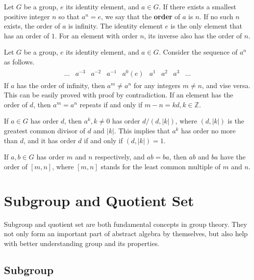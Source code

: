 Let $G$ be a group, $e$ its identity element, and $a\in G$. If there exists a smallest positive integer $n$ so that $a^n = e$, we say that the \textbf{order} of $a$ is $n$. If no such $n$ exists, the order of $a$ is infinity. The identity element $e$ is the only element that has an order of $1$. For an element with order $n$, its inverse also has the order of $n$.

Let $G$ be a group, $e$ its identity element, and $a\in G$. Consider the sequence of $a^n$ as follows.
\begin{eqnarray}
\begin{array}{ccccccccc}
  \ldots & a^{-3} & a^{-2} & a^{-1} & a^0 (e) & a^1 & a^2 & a^3 & \ldots \nonumber 
\end{array}
\end{eqnarray}
If $a$ has the order of infinity, then $a^m \neq a^n$ for any integers $m\neq n$, and vise versa. This can be easily proved with proof by contradiction. If an element has the order of $d$, then $a^m = a^n$ repeats if and only if $m-n = kd, k\in \mathbb{Z}$.

If $a \in G$ has order $d$, then $a^{k}, k\neq0$ has order $d/(d,|k|)$, where $(d,|k|)$ is the greatest common divisor of $d$ and $|k|$. This implies that $a^{k}$ has order no more than $d$, and it has order $d$ if and only if $(d,|k|)=1$.

If $a,b \in G$ has order $m$ and $n$ respectively, and $ab=ba$, then $ab$ and $ba$ have the order of $[m,n]$, where $[m,n]$ stands for the least common multiple of $m$ and $n$.

\section{Subgroup and Quotient Set}

Subgroup and quotient set are both fundamental concepts in group theory. They not only form an important part of abstract algebra by themselves, but also help with better understanding group and its properties.

\subsection{Subgroup}


